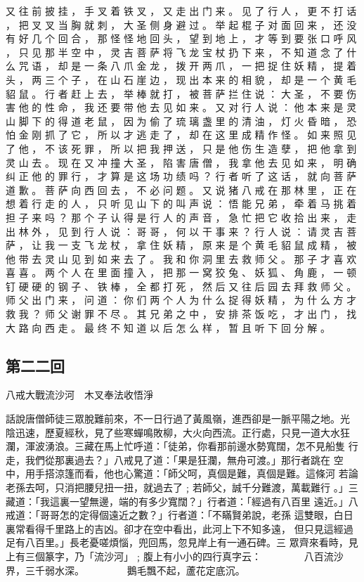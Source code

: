 {又 往 前 披 挂 ， 手 叉 着 铁 叉 ， 又 走 出 门 来 。
见 了 行 人 ， 更 不 打 话 ， 把 叉 叉 当 胸 就 刺 ， 大 圣 侧 身 避 过 。
举 起 棍 子 对 面 回 来 ， 还 没 有 好 几 个 回 合 ， 那 怪 怪 地 回 头 ， 望 到 地 上 ， 才 等 到 要 张 口 呼 风 ， 只 见 那 半 空 中 ， 灵 吉 菩 萨 将 飞 龙 宝 杖 扔 下 来 ， 不 知 道 念 了 什 么 咒 语 ， 却 是 一 条 八 爪 金 龙 ， 拨 开 两 爪 ， 一 把 捉 住 妖 精 ， 提 着 头 ， 两 三 个 子 ， 在 山 石 崖 边 ， 现 出 本 来 的 相 貌 ， 却 是 一 个 黄 毛 貂 鼠 。
行 者 赶 上 去 ， 举 棒 就 打 ， 被 菩 萨 拦 住 说 ： 大 圣 ， 不 要 伤 害 他 的 性 命 ， 我 还 要 带 他 去 见 如 来 。
又 对 行 人 说 ： 他 本 来 是 灵 山 脚 下 的 得 道 老 鼠 ， 因 为 偷 了 琉 璃 盏 里 的 清 油 ， 灯 火 昏 暗 ， 恐 怕 金 刚 抓 了 它 ， 所 以 才 逃 走 了 ， 却 在 这 里 成 精 作 怪 。
如 来 照 见 了 他 ， 不 该 死 罪 ， 所 以 把 我 押 送 ， 只 是 他 伤 生 造 孽 ， 把 他 拿 到 灵 山 去 。
现 在 又 冲 撞 大 圣 ， 陷 害 唐 僧 ， 我 拿 他 去 见 如 来 ， 明 确 纠 正 他 的 罪 行 ， 才 算 是 这 场 功 绩 吗 ？
行 者 听 了 这 话 ， 就 向 菩 萨 道 歉 。
菩 萨 向 西 回 去 ， 不 必 问 题 。
又 说 猪 八 戒 在 那 林 里 ， 正 在 想 着 行 走 的 人 ， 只 听 见 山 下 的 叫 声 说 ： 悟 能 兄 弟 ， 牵 着 马 挑 着 担 子 来 吗 ？
那 个 子 认 得 是 行 人 的 声 音 ， 急 忙 把 它 收 拾 出 来 ， 走 出 林 外 ， 见 到 行 人 说 ： 哥 哥 ， 何 以 干 事 来 ？ 行 人 说 ： 请 灵 吉 菩 萨 ， 让 我 一 支 飞 龙 杖 ， 拿 住 妖 精 ， 原 来 是 个 黄 毛 貂 鼠 成 精 ， 被 他 带 去 灵 山 见 到 如 来 去 了 。
我 和 你 洞 里 去 救 师 父 。
那 子 才 喜 欢 喜 喜 。
两 个 人 在 里 面 撞 入 ， 把 那 一 窝 狡 兔 、 妖 狐 、 角 鹿 ， 一 顿 钉 硬 硬 的 钢 子 、 铁 棒 ， 全 都 打 死 ， 然 后 又 往 后 园 去 拜 救 师 父 。
师 父 出 门 来 ， 问 道 ： 你 们 两 个 人 为 什 么 捉 得 妖 精 ， 为 什 么 方 才 救 我 ？
师 父 谢 罪 不 尽 。
其 兄 弟 之 中 ， 安 排 茶 饭 吃 ， 才 出 门 ， 找 大 路 向 西 走 。
最 终 不 知 道 以 后 怎 么 样 ， 暂 且 听 下 回 分 解 。
}\switchcolumn\flushpage  \begin{pinyinscope}{\myfontt \section{第二二回}     八戒大戰流沙河　木叉奉法收悟淨

話說唐僧師徒三眾脫難前來，不一日行過了黃風嶺，進西卻是一脈平陽之地。光
陰迅速，歷夏經秋，見了些寒蟬鳴敗柳，大火向西流。正行處，只見一道大水狂
瀾，渾波湧浪。三藏在馬上忙呼道：「徒弟，你看那前邊水勢寬闊，怎不見船隻
行走，我們從那裏過去？」八戒見了道：「果是狂瀾，無舟可渡。」那行者跳在
空中，用手搭涼篷而看，他也心驚道：「師父呵，真個是難，真個是難。這條河
若論老孫去呵，只消把腰兒扭一扭，就過去了﹔若師父，誠千分難渡，萬載難行
。」三藏道：「我這裏一望無邊，端的有多少寬闊？」行者道：「經過有八百里
遠近。」八戒道：「哥哥怎的定得個遠近之數？」行者道：「不瞞賢弟說，老孫
這雙眼，白日裏常看得千里路上的吉凶。卻才在空中看出，此河上下不知多遠，
但只見這經過足有八百里。」長老憂嗟煩惱，兜回馬，忽見岸上有一通石碑。三
眾齊來看時，見上有三個篆字，乃「流沙河」﹔腹上有小小的四行真字云：
　　　　八百流沙界，三千弱水深。
　　　　鵝毛飄不起，蘆花定底沉。

}
\end{pinyinscope}
